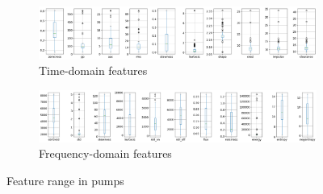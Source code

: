 \begin{figure}[h]
    \centering
    \begin{subfigure}[b]{\textwidth}
        \includegraphics[width=\textwidth]{assets/results/feature-values/pumps-TD-dim-3.png}
        \caption{Time-domain features}
    \end{subfigure}
    \hfill
    \begin{subfigure}[b]{\textwidth}
        \includegraphics[width=\textwidth]{assets/results/feature-values/pumps-FD-dim-3.png}
        \caption{Frequency-domain features}
    \end{subfigure}
    \caption{Feature range in pumps}
\end{figure}

